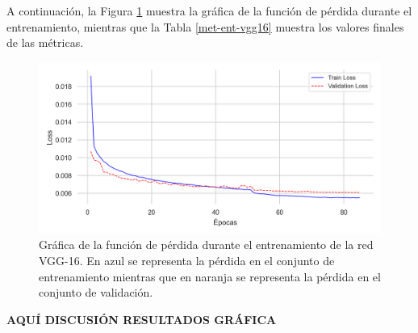 A continuación, la Figura \ref{fig30} muestra la gráfica de la función de pérdida durante el entrenamiento, mientras que la Tabla \ref{met-ent-vgg16} muestra los valores finales de las métricas.

\begin{figure}[h]
	\centering
	\includegraphics[scale=0.6]{imagenes/cap5/train_loss_vgg16.png}
	\caption[Gráfica de pérdida VGG-16.]{Gráfica de la función de pérdida durante el entrenamiento de la red VGG-16. En azul se representa la pérdida en el conjunto de entrenamiento mientras que en naranja se representa la pérdida en el conjunto de validación.}
	\label{fig30}
\end{figure}

\textbf{AQUÍ DISCUSIÓN RESULTADOS GRÁFICA}

